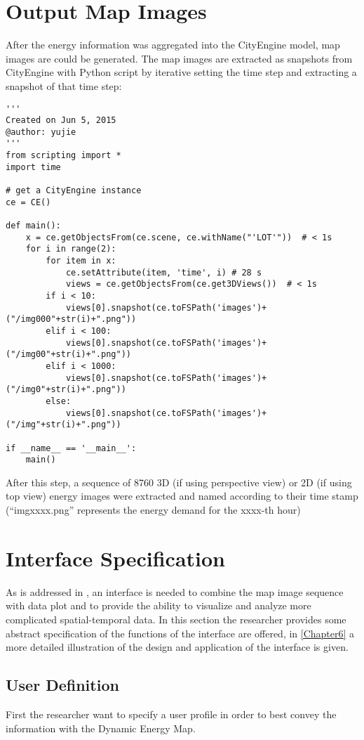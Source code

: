 \section{Output Map Images}
After the energy information was aggregated into the CityEngine model,
map images are could be generated. The map images are extracted as
snapshots from CityEngine with Python script by iterative setting the
time step and extracting a snapshot of that time step:

\makeatletter
\def\verbatim@font{\linespread{1}\tiny\ttfamily} \makeatother
\begin{verbatim}
'''
Created on Jun 5, 2015
@author: yujie
'''
from scripting import *
import time

# get a CityEngine instance
ce = CE()

def main():
    x = ce.getObjectsFrom(ce.scene, ce.withName("'LOT'"))  # < 1s
    for i in range(2):
        for item in x:
            ce.setAttribute(item, 'time', i) # 28 s
            views = ce.getObjectsFrom(ce.get3DViews())  # < 1s
        if i < 10:
            views[0].snapshot(ce.toFSPath('images')+("/img000"+str(i)+".png"))
        elif i < 100:
            views[0].snapshot(ce.toFSPath('images')+("/img00"+str(i)+".png"))
        elif i < 1000:
            views[0].snapshot(ce.toFSPath('images')+("/img0"+str(i)+".png"))
        else:
            views[0].snapshot(ce.toFSPath('images')+("/img"+str(i)+".png"))

if __name__ == '__main__':
    main()
\end{verbatim}
After this step, a sequence of 8760 3D (if using perspective view) or
2D (if using top view) energy images were extracted and named
according to their time stamp (``imgxxxx.png'' represents the energy
demand for the xxxx-th hour)

\section{Interface Specification}\label{interfaceSpec}
As is addressed in , an interface is needed to
combine the map image sequence with data plot and to provide the
ability to visualize and analyze more complicated spatial-temporal
data. In this section the researcher provides some abstract
specification of the functions of the interface are offered, in
\cref{Chapter6} a more detailed illustration of the design and
application of the interface is given.

\subsection{User Definition}
First the researcher want to specify a user profile in order to best
convey the information with the Dynamic Energy Map.

